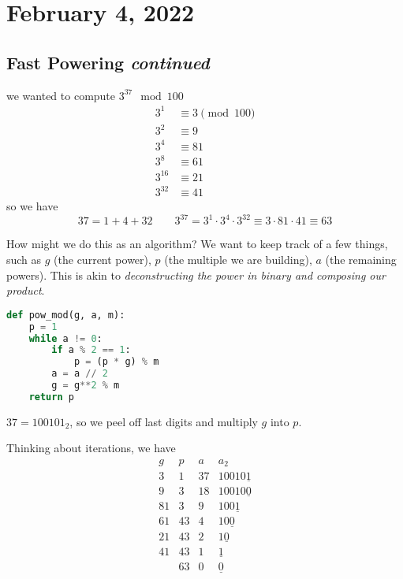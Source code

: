 \section{February 4, 2022}
\subsection{Fast Powering \emph{continued}}
\begin{example}
    \recall we wanted to compute $3^{37}\mod 100$
    \begin{align*}
        3^1    & \equiv 3\pmod{100} \\
        3^2    & \equiv 9           \\
        3^4    & \equiv 81          \\
        3^8    & \equiv 61          \\
        3^{16} & \equiv 21          \\
        3^{32} & \equiv 41
    \end{align*}
    so we have
    \[37=1+4+32 \qquad 3^{37} = 3^1\cdot 3^4\cdot 3^{32} \equiv 3\cdot 81\cdot 41\equiv 63\]
\end{example}
How might we do this as an algorithm? We want to keep track of a few things, such as $g$ (the current power), $p$ (the multiple we are building), $a$ (the remaining powers). This is akin to \emph{deconstructing the power in binary and composing our product}.

\begin{lstlisting}[language=Python]
def pow_mod(g, a, m):
    p = 1
    while a != 0:
        if a % 2 == 1:
            p = (p * g) % m
        a = a // 2
        g = g**2 % m
    return p
\end{lstlisting}

\begin{example}
    $37=100101_2$, so we peel off last digits and multiply $g$ into $p$.

    Thinking about iterations, we have
    \[\begin{array}{llll}
            g  & p          & a  & a_2                \\ \hline
            3  & 1          & 37 & 10010\underline{1} \\
            9  & 3          & 18 & 10010\underline{0} \\
            81 & 3          & 9  & 100\underline{1}   \\
            61 & 43         & 4  & 10\underline{0}    \\
            21 & 43         & 2  & 1\underline{0}     \\
            41 & 43         & 1  & \underline{1}      \\
               & \boxed{63} & 0  & \underline{0}
        \end{array}\]
\end{example}

